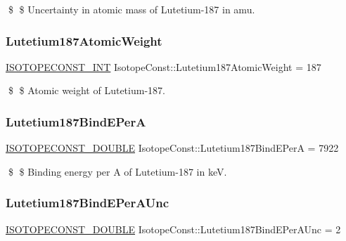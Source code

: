 \$ \$ Uncertainty in atomic mass of Lutetium-\/187 in amu. \mbox{\label{group___isotope_const-_lutetium-_lu187_gab57b782c923ea7acf55cb8e832d8a2c1}} 
\subsubsection{\texorpdfstring{Lutetium187\+Atomic\+Weight}{Lutetium187AtomicWeight}}
{\footnotesize\ttfamily \mbox{\hyperlink{group___isotope_const-_macros_ga5f18360b3e99483a35c32d789e62621c}{I\+S\+O\+T\+O\+P\+E\+C\+O\+N\+S\+T\+\_\+\+I\+NT}} Isotope\+Const\+::\+Lutetium187\+Atomic\+Weight = 187}

\$ \$ Atomic weight of Lutetium-\/187. \mbox{\label{group___isotope_const-_lutetium-_lu187_gad9aedfd91faed7eeed7bc3c2d702c86b}} 
\subsubsection{\texorpdfstring{Lutetium187\+Bind\+E\+PerA}{Lutetium187BindEPerA}}
{\footnotesize\ttfamily \mbox{\hyperlink{group___isotope_const-_macros_ga8f45a7272ce02c0b4c65c44636ed719a}{I\+S\+O\+T\+O\+P\+E\+C\+O\+N\+S\+T\+\_\+\+D\+O\+U\+B\+LE}} Isotope\+Const\+::\+Lutetium187\+Bind\+E\+PerA = 7922}

\$ \$ Binding energy per A of Lutetium-\/187 in keV. \mbox{\label{group___isotope_const-_lutetium-_lu187_ga6b13d532d29271bdfe2e027b88b30791}} 
\subsubsection{\texorpdfstring{Lutetium187\+Bind\+E\+Per\+A\+Unc}{Lutetium187BindEPerAUnc}}
{\footnotesize\ttfamily \mbox{\hyperlink{group___isotope_const-_macros_ga8f45a7272ce02c0b4c65c44636ed719a}{I\+S\+O\+T\+O\+P\+E\+C\+O\+N\+S\+T\+\_\+\+D\+O\+U\+B\+LE}} Isotope\+Const\+::\+Lutetium187\+Bind\+E\+Per\+A\+Unc = 2}

